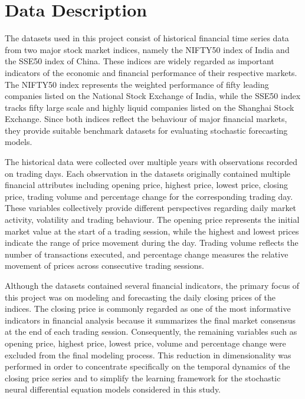\chapter{Data Description}

The datasets used in this project consist of historical financial time series data from two major stock market indices, namely the NIFTY50 index of India and the SSE50 index of China. These indices are widely regarded as important indicators of the economic and financial performance of their respective markets. The NIFTY50 index represents the weighted performance of fifty leading companies listed on the National Stock Exchange of India, while the SSE50 index tracks fifty large scale and highly liquid companies listed on the Shanghai Stock Exchange. Since both indices reflect the behaviour of major financial markets, they provide suitable benchmark datasets for evaluating stochastic forecasting models.

The historical data were collected over multiple years with observations recorded on trading days. Each observation in the datasets originally contained multiple financial attributes including opening price, highest price, lowest price, closing price, trading volume and percentage change for the corresponding trading day. These variables collectively provide different perspectives regarding daily market activity, volatility and trading behaviour. The opening price represents the initial market value at the start of a trading session, while the highest and lowest prices indicate the range of price movement during the day. Trading volume reflects the number of transactions executed, and percentage change measures the relative movement of prices across consecutive trading sessions.

Although the datasets contained several financial indicators, the primary focus of this project was on modeling and forecasting the daily closing prices of the indices. The closing price is commonly regarded as one of the most informative indicators in financial analysis because it summarizes the final market consensus at the end of each trading session. Consequently, the remaining variables such as opening price, highest price, lowest price, volume and percentage change were excluded from the final modeling process. This reduction in dimensionality was performed in order to concentrate specifically on the temporal dynamics of the closing price series and to simplify the learning framework for the stochastic neural differential equation models considered in this study.

